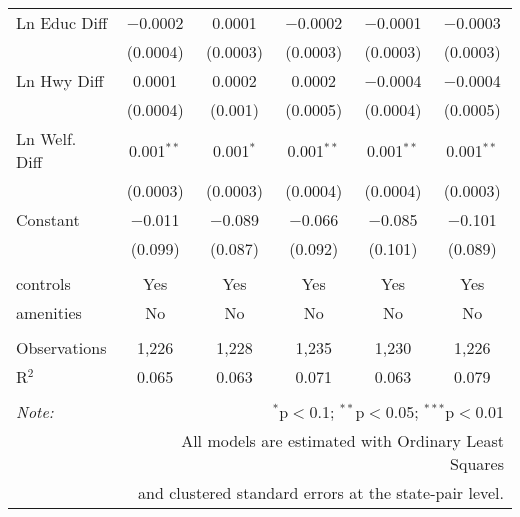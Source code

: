 \begin{table}[!htbp]
\begin{tabular}{@{\extracolsep{5pt}}lccccc}
  Ln Educ Diff & $-$0.0002 & 0.0001 & $-$0.0002 & $-$0.0001 & $-$0.0003 \\ 
  & (0.0004) & (0.0003) & (0.0003) & (0.0003) & (0.0003) \\ 
  Ln Hwy Diff & 0.0001 & 0.0002 & 0.0002 & $-$0.0004 & $-$0.0004 \\ 
  & (0.0004) & (0.001) & (0.0005) & (0.0004) & (0.0005) \\ 
  Ln Welf. Diff & 0.001$^{**}$ & 0.001$^{*}$ & 0.001$^{**}$ & 0.001$^{**}$ & 0.001$^{**}$ \\ 
  & (0.0003) & (0.0003) & (0.0004) & (0.0004) & (0.0003) \\ 
  Constant & $-$0.011 & $-$0.089 & $-$0.066 & $-$0.085 & $-$0.101 \\ 
  & (0.099) & (0.087) & (0.092) & (0.101) & (0.089) \\ 
 \hline \\[-1.8ex] 
controls & Yes & Yes & Yes & Yes & Yes \\ 
amenities & No & No & No & No & No \\ 
\hline \\[-1.8ex] 
Observations & 1,226 & 1,228 & 1,235 & 1,230 & 1,226 \\ 
R$^{2}$ & 0.065 & 0.063 & 0.071 & 0.063 & 0.079 \\ 
\hline 
\hline \\[-1.8ex] 
\textit{Note:}  & \multicolumn{5}{r}{$^{*}$p$<$0.1; $^{**}$p$<$0.05; $^{***}$p$<$0.01} \\ 
 & \multicolumn{5}{r}{All models are estimated with Ordinary Least Squares} \\ 
 & \multicolumn{5}{r}{and clustered standard errors at the state-pair level.} \\ 
\end{tabular} 
\end{table} 
